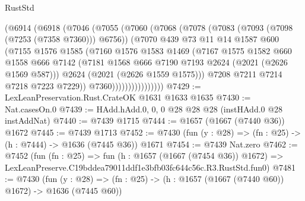 \begin{lexlean}{RustStd}
\begin{coremodule}
                    (@6914
                      (@6918
                        (@7046
                          (@7055
                            (@7060
                              (@7068
                                (@7078
                                  (@7083 (@7093 (@7098 (@7253 (@7358 @7360))) @6756))
                                  (@7070
                                    @439
                                    @73
                                    @11
                                    @14
                                    @1587
                                    @600
                                    (@7155
                                      @1576
                                      @1585
                                      (@7160
                                        @1576
                                        @1583
                                        @1469
                                        (@7167
                                          @1575
                                          @1582
                                          @660
                                          @1558
                                          @666
                                          @7142
                                          (@7181
                                            @1568
                                            @666
                                            @7190
                                            @7193
                                            @2624
                                            (@2021 (@2626 @1569 @587)))
                                          @2624
                                          (@2021 (@2626 @1559 @1575)))
                                        @7208
                                        @7211
                                        @7214
                                        @7218
                                        @7223
                                        @7229))
                                    @7360))))))))))))))))
@7429 := LexLeanPreservation.Rust.CrateOK @1631 @1633 @1635
@7430 := Nat.casesOn.{0}
@7439 := HAdd.hAdd.{0, 0, 0} @28 @28 @28 (instHAdd.{0} @28 instAddNat)
@7440 := @7439 @1715
@7444 := @1657 (@1667 (@7440 @36)) @1672
@7445 := @7439 @1713
@7452 := @7430 (fun (y : @28) => (fn : @25) -> (h : @7444) -> @1636 (@7445 @36)) @1671
@7454 := @7439 Nat.zero
@7462 := @7452
    (fun (fn : @25) =>
    fun (h : @1657 (@1667 (@7454 @36)) @1672) =>
    LexLeanPreserve.C19bddea79011ddf1e3bfb03fc644c56c.R3.RustStd.fun0)
@7481 := @7430
    (fun (y : @28) => (fn : @25) -> (h : @1657 (@1667 (@7440 @60)) @1672) -> @1636 (@7445 @60))

\end{coremodule}
\end{lexlean}
